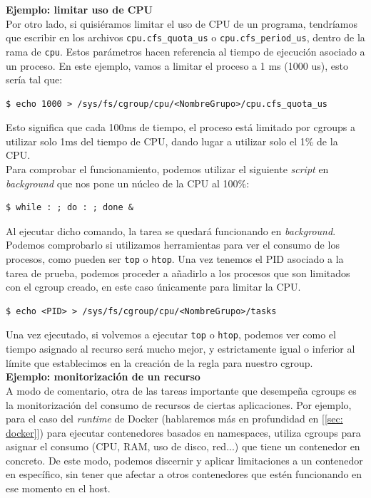 \documentclass[a4paper, oneside, 12pt]{book}
\begin{document}
	\vspace{10px}
	\noindent \textbf{\large Ejemplo: limitar uso de CPU}\\
	
	\noindent Por otro lado, si quisiéramos limitar el uso de CPU de un programa, tendríamos que escribir en los archivos \texttt{cpu.cfs\_quota\_us} o \texttt{cpu.cfs\_period\_us}, dentro de la rama de \texttt{cpu}. Estos parámetros hacen referencia al tiempo de ejecución asociado a un proceso. En este ejemplo, vamos a limitar el proceso a 1 ms (1000 us), esto sería tal que:
	
	\begin{verbatim}
$ echo 1000 > /sys/fs/cgroup/cpu/<NombreGrupo>/cpu.cfs_quota_us
	\end{verbatim}

	\noindent Esto significa que cada 100ms de tiempo, el proceso está limitado por cgroups a utilizar solo 1ms del tiempo de CPU, dando lugar a utilizar solo el 1\% de la CPU. \\

	\noindent Para comprobar el funcionamiento, podemos utilizar el siguiente \textit{script} en \textit{background} que nos pone un núcleo de la CPU al 100\%:
	\begin{verbatim}
$ while : ; do : ; done &
	\end{verbatim}

	\noindent Al ejecutar dicho comando, la tarea se quedará funcionando en \textit{background}. Podemos comprobarlo si utilizamos herramientas para ver el consumo de los procesos, como pueden ser \texttt{top} o \texttt{htop}. Una vez tenemos el PID asociado a la tarea de prueba, podemos proceder a añadirlo a los procesos que son limitados con el cgroup creado, en este caso únicamente para limitar la CPU.
	\begin{verbatim}
$ echo <PID> > /sys/fs/cgroup/cpu/<NombreGrupo>/tasks
	\end{verbatim}

	\noindent Una vez ejecutado, si volvemos a ejecutar \texttt{top} o \texttt{htop}, podemos ver como el tiempo asignado al recurso será mucho mejor, y estrictamente igual o inferior al límite que establecimos en la creación de la regla para nuestro cgroup.	\\
	
	\vspace{10px}
	\noindent \textbf{\large Ejemplo: monitorización de un recurso}\\
	
	\noindent A modo de comentario, otra de las tareas importante que desempeña cgroups es la monitorización del consumo de recursos de ciertas aplicaciones. Por ejemplo, para el caso del \textit{runtime} de Docker (hablaremos más en profundidad en [\ref{sec: docker}]) para ejecutar contenedores basados en namespaces, utiliza cgroups para asignar el consumo (CPU, RAM, uso de disco, red...) que tiene un contenedor en concreto. De este modo, podemos discernir y aplicar limitaciones a un contenedor en específico, sin tener que afectar a otros contenedores que estén funcionando en ese momento en el host. \\
	
\end{document}
